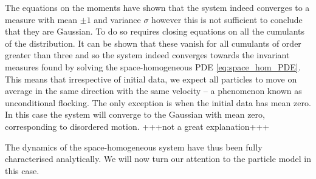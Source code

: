 \documentclass[11pt, a4pape draft]{article}
\begin{document}
        The equations on the moments have shown that the system indeed converges to a measure with mean $\pm 1$ and variance $\sigma$ however this is not sufficient to conclude that they are Gaussian. To do so requires closing equations on all the cumulants of the distribution. It can be shown that these vanish for all cumulants of order greater than three and so the system indeed converges towards the invariant measures found by solving the space-homogeneous PDE \eqref{eq:space_hom_PDE}. This means that irrespective of initial data, we expect all particles to move on average in the same direction with the same velocity -- a phenomenon known as unconditional flocking. The only exception is when the initial data has mean zero. In this case the system will converge to the Gaussian with mean zero, corresponding to disordered motion. +++not a great explanation+++
        
        The dynamics of the space-homogeneous system have thus been fully characterised analytically. We will now turn our attention to the particle model in this case.
\end{document}
